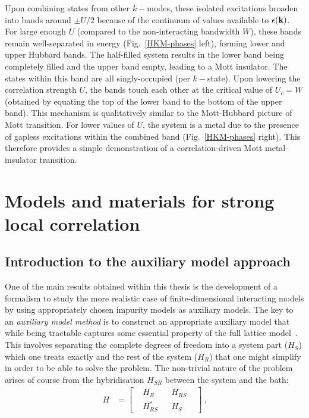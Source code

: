 Upon combining states from other \(k-\)modes, these isolated excitations broaden into bands around \(\pm U/2\) because of the continuum of values available to \(\epsilon({\bf k})\). For large enough \(U\) (compared to the non-interacting bandwidth \(W\)), these bands remain well-separated in energy (Fig.~\ref{HKM-phases} left), forming lower and upper Hubbard bands. The half-filled system results in the lower band being completely filled and the upper band empty, leading to a Mott insulator. The states within this band are all singly-occupied (per \(k-\)state). Upon lowering the correlation strength \(U\), the bands touch each other at the critical value of \(U_c = W\) (obtained by equating the top of the lower band to the bottom of the upper band). This mechanism is qualitatively similar to the Mott-Hubbard picture of Mott transition. For lower values of \(U\), the system is a metal due to the presence of gapless excitations within the combined band (Fig.~\ref{HKM-phases} right). This therefore provides a simple demonstration of a correlation-driven Mott metal-insulator transition.

\section{Models and materials for strong local correlation}
\subsection{Introduction to the auxiliary model approach}
One of the main results obtained within this thesis is the development of a formalism to study the more realistic case of finite-dimensional interacting models by using appropriately chosen impurity models as auxiliary models. The key to an {\it auxiliary model method} is to construct an appropriate auxiliary model that while being tractable captures some essential property of the full lattice model~\cite{martin_2016}. This involves separating the complete degrees of freedom into a system part (\(H_S\)) which one treats exactly and the rest of the system (\(H_R\)) that one might simplify in order to be able to solve the problem. The non-trivial nature of the problem arises of course from the hybridisation \(H_{SR}\) between the system and the bath:
\begin{equation}\begin{aligned}
	{H} &= \begin{bmatrix} & {H}_{R} && {H}_{RS} & \\ & {H}_{RS}^* && {H}_{S} & \end{bmatrix}~.
\end{aligned}\end{equation}

